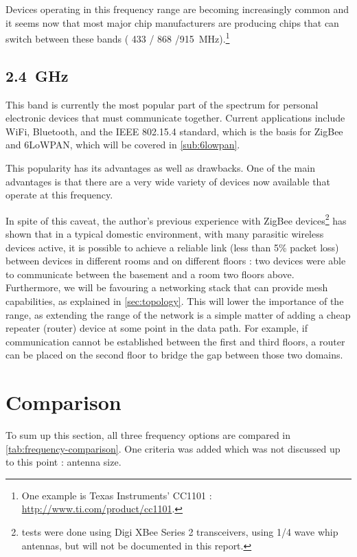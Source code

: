 Devices operating in this frequency range are becoming increasingly common and
it seems now that most major chip manufacturers are producing chips that can
switch between these bands ( 433 / 868 /\SI{915}{MHz}).\footnote{One example is
Texas Instruments' CC1101 : \url{http://www.ti.com/product/cc1101}.}

\subsection{\SI{2.4}{GHz}}

This band is currently the most popular part of the spectrum for personal
electronic devices that must communicate together. Current applications include
WiFi, Bluetooth, and the IEEE 802.15.4 standard, which is the basis for ZigBee
and \ac{6LoWPAN}, which will be covered in \autoref{sub:6lowpan}.

This popularity has its advantages as well as drawbacks. One of the main
advantages is that there are a very wide variety of devices now available that
operate at this frequency. 

In spite of this caveat, the author's previous experience with ZigBee
devices\footnote{tests were done using Digi XBee Series 2 transceivers, using
1/4 wave whip antennas, but will not be documented in this report.}
has shown that in a typical domestic environment, with many parasitic wireless
devices active, it is possible to achieve a reliable link (less than 5\% packet
loss) between devices in different rooms and on different floors : two devices
were able to communicate between the basement and a room two floors above.
Furthermore, we will be favouring a networking stack that can provide mesh
capabilities, as explained in \autoref{sec:topology}. This will lower the
importance of the range, as extending the range of the network is a simple
matter of adding a cheap repeater (router) device at some point in the data
path. For example, if communication cannot be established between the first and
third floors, a router can be placed on the second floor to bridge the gap
between those two domains.


\section{Comparison}

To sum up this section, all three frequency options are compared in
\autoref{tab:frequency-comparison}. One criteria was added which was not
discussed up to this point : antenna size.

